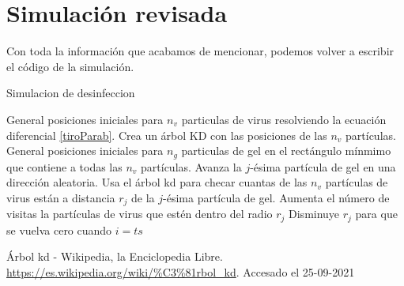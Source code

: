 \documentclass[11pt]{article}
\begin{document}
\section{Simulación revisada}
Con toda la información que acabamos de mencionar, podemos volver a escribir el código de la simulación. 
\begin{algorithm}[h]
    \caption{Simulacion de desinfeccion}
    \begin{algorithmic}[1]
        \State General posiciones iniciales para $n_v$ particulas de virus resolviendo la ecuación diferencial \ref{tiroParab}.
        \State Crea un árbol KD con las posiciones de las $n_v$ partículas.
        \State General posiciones iniciales para $n_g$ particulas de gel en el rectángulo mínmimo que contiene a todas las $n_v$ partículas.
                \State Avanza la $j$-ésima partícula de gel en una dirección aleatoria.
                \State Usa el árbol kd para checar cuantas de las $n_v$ partículas de virus están a distancia $r_j$ de la $j$-ésima partícula de gel. 
                \State Aumenta el número de visitas la partículas de virus que estén dentro del radio $r_j$
                    \State Disminuye $r_j$ para que se vuelva cero cuando $i = ts$
                \EndIf 
            \EndFor
        \EndFor
    \EndFunction
    \end{algorithmic}
\end{algorithm}
\begin{thebibliography}{9}
      Árbol kd - Wikipedia, la Enciclopedia Libre.
      \url{https://es.wikipedia.org/wiki/%C3%81rbol_kd}. Accesado el 25-09-2021
\end{thebibliography}
\end{document}
